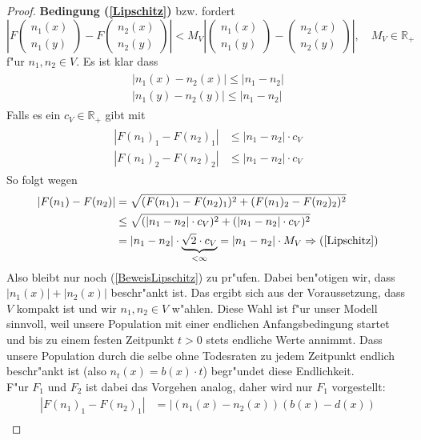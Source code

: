 \documentclass[11pt,a4paper]{article}
\theoremstyle{plain}
\newcommand{\tvec}[2]{\begin{pmatrix}#1\\#2\end{pmatrix}}
\begin{document}
\begin{proof}
	\textbf{Bedingung (\ref{Lipschitz})} bzw. \cite[Kapitel 11 - \textbf{Thm 2.1} (2.7)]{ethier2009markov} fordert
	\[ \left| F\tvec{n_1(x)}{n_1(y)} - F\tvec{n_2(x)}{n_2(y)} \right| < M_V \left| \tvec{n_1(x)}{n_1(y)} - \tvec{n_2(x)}{n_2(y)} \right|, \quad M_V \in \mathbb{R}_{+} \]
	f"ur $ n_1, n_2 \in V $. Es ist klar dass
	\begin{align}
	\begin{split}
		|n_1(x) - n_2(x)| \le |n_1 - n_2|\\
		|n_1(y) - n_2(y)| \le |n_1 - n_2| \label{epsAbsch}
	\end{split}
	\end{align}
	Falls es ein $ c_V \in \mathbb{R}_{+} $ gibt mit
	\begin{align}
	\begin{split}
		|F(n_1)_1 - F(n_2)_1| &\le |n_1 - n_2| \cdot c_V\\
		|F(n_1)_2 - F(n_2)_2| &\le |n_1 - n_2| \cdot c_V \label{BeweisLipschitz}
	\end{split}
	\end{align}
	So folgt wegen 
	\begin{align}
	\begin{split}
		|F(n_1) - F(n_2)| &= \sqrt{(F(n_1)_1 - F(n_2)_1)^2 + (F(n_1)_2 - F(n_2)_2)^2}\\
		&\le \sqrt{(|n_1 - n_2| \cdot c_V)^2 + (|n_1 - n_2| \cdot c_V)^2}\\
		&= |n_1 - n_2| \cdot \underbrace{\sqrt{2} \cdot c_V}_{< \infty} = |n_1 - n_2| \cdot M_V \Rightarrow (\ref{Lipschitz})
		\label{epsBehauptung}
	\end{split}
	\end{align}
	Also bleibt nur noch (\ref{BeweisLipschitz}) zu pr"ufen. Dabei ben"otigen wir, dass $ |n_1(x)| + |n_2(x)| $ beschr"ankt ist. Das ergibt sich aus der Voraussetzung, dass $ V $ kompakt ist und wir $ n_1, n_2 \in V $ w"ahlen. Diese Wahl ist f"ur unser Modell sinnvoll, weil unsere Population mit einer endlichen Anfangsbedingung startet und bis zu einem festen Zeitpunkt $ t > 0 $ stets endliche Werte annimmt. Dass unsere Population durch die selbe ohne Todesraten zu jedem Zeitpunkt endlich beschr"ankt ist (also $ n_t(x) = b(x) \cdot t $) begr"undet diese Endlichkeit.\\
	F"ur $ F_1 $ und $ F_2 $ ist dabei das Vorgehen analog, daher wird nur $ F_1 $ vorgestellt:\\
	\begin{align*}
		|F(n_1)_1 - F(n_2)_1| & = |(n_1(x) - n_2(x))(b(x) - d(x)) \\

\end{align*}
\end{proof}
\end{document}
